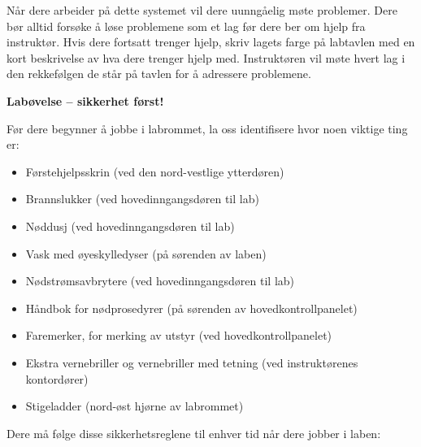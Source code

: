 Når dere arbeider på dette systemet vil dere uunngåelig møte problemer.  Dere bør alltid forsøke å løse problemene som et lag før dere ber om hjelp fra instruktør.  Hvis dere fortsatt trenger hjelp, skriv lagets farge på labtavlen med en kort beskrivelse av hva dere trenger hjelp med.  Instruktøren vil møte hvert lag i den rekkefølgen de står på tavlen for å adressere problemene.








\vfil \eject

\noindent
{\bf Labøvelse -- sikkerhet først!}

\vskip 30pt

\noindent
Før dere begynner å jobbe i labrommet, la oss identifisere hvor noen viktige ting er:

\begin{itemize}
\item{} Førstehjelpsskrin (ved den nord-vestlige ytterdøren)
\vskip 10pt
\item{} Brannslukker (ved hovedinngangsdøren til lab)
\vskip 10pt
\item{} Nøddusj (ved hovedinngangsdøren til lab)
\vskip 10pt
\item{} Vask med øyeskylledyser (på sørenden av laben)
\vskip 10pt
\item{} Nødstrømsavbrytere (ved hovedinngangsdøren til lab)
\vskip 10pt
\item{} Håndbok for nødprosedyrer (på sørenden av hovedkontrollpanelet)
\vskip 10pt
\item{} Faremerker, for merking av utstyr (ved hovedkontrollpanelet)
\vskip 10pt
\item{} Ekstra vernebriller og vernebriller med tetning (ved instruktørenes kontordører)
\vskip 10pt
\item{} Stigeladder (nord-øst hjørne av labrommet)
\end{itemize}

\vskip 30pt

\noindent
Dere må følge disse sikkerhetsreglene til enhver tid når dere jobber i laben:

